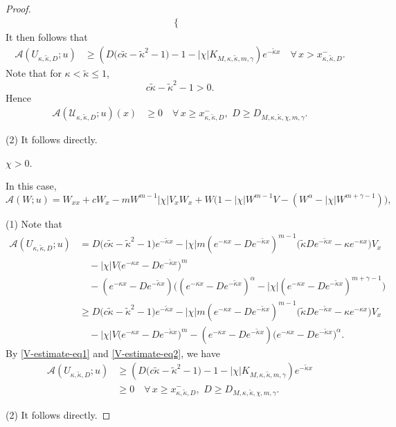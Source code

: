 \documentclass[11pt]{article} %
\theoremstyle{remark}
\theoremstyle{remark}
\numberwithin{equation}{section}
\numberwithin{figure}{section}
\numberwithin{table}{section}
\begin{document}
\begin{proof}
\begin{align*}
\begin{cases}
\end{cases}
\end{align*}
It then follows that
\begin{align*}
\mathcal{A} (U_{\kappa,\tilde\kappa, D};u)
&\ge \left( D\big( c\tilde\kappa-\tilde\kappa^2 -1\big) -1-|\chi| K_{M,\kappa,\tilde\kappa,m,\gamma} \right)  e^{-\tilde \kappa x}\quad \forall\, x>x_{\kappa,\tilde\kappa,D}^-.
\end{align*}
Note that 
for $\kappa<\tilde\kappa\le 1$, 
$$
c\tilde\kappa -\tilde \kappa^2 -1>0.
$$ 
Hence
\begin{align*}
\mathcal{A}(\mathcal{U}_{\kappa,\tilde\kappa,D};u)(x)&\ge 0\quad \forall\, x\ge x_{\kappa,\tilde\kappa,D}^-,\,\, D\ge D_{M,\kappa,\tilde\kappa,\chi,m,\gamma}.
\end{align*}


(2)  It follows directly.


\smallskip


 $\chi>0$.

\smallskip

In this case,
$$
\mathcal{A}(W;u)=W_{xx}+cW_x- m W^{m-1} |\chi| V_x W_x + W\big(1- |\chi|W^{m-1} V -(W^\alpha -|\chi| W^{m+\gamma-1})\big),
$$

\smallskip

(1) Note that 
\begin{align*}
\mathcal{A}(U_{\kappa,\tilde\kappa,D};u)   
&={ D\Big(c\tilde\kappa-{\tilde\kappa^2}-1\Big) e^{-\tilde \kappa x} } -{ |\chi| m (e^{-\kappa x}-De^{-\tilde \kappa x})^{m-1} \Big(\tilde\kappa D e^{-\tilde\kappa x}-\kappa e^{-\kappa x}\Big) V_x }\\
&\quad -{ |\chi|  V\big(e^{-\kappa x}-D e^{-\tilde \kappa  x}\big)^m}\\
&\quad -{ (e^{-\kappa x}-De^{-\tilde\kappa x})\Big ((e^{- \kappa x}-D e^{-\tilde \kappa x})^\alpha -|\chi|  (e^{-\kappa x}-D e^{-\tilde \kappa x})^{m+\gamma -1}\Big ) }\\
&\ge { D\Big(c\tilde\kappa-{\tilde\kappa^2}-1\Big) e^{-\tilde \kappa x} } -{ |\chi| m (e^{-\kappa x}-De^{-\tilde \kappa x})^{m-1} \Big(\tilde\kappa D e^{-\tilde\kappa x}-\kappa e^{-\kappa x}\Big) V_x }\\
&\quad -{ |\chi|  V\big(e^{-\kappa x}-D e^{-\tilde \kappa  x}\big)^m} -{ (e^{-\kappa x}-De^{-\tilde\kappa x})\big(e^{- \kappa x}-D e^{-\tilde \kappa x}\big)^\alpha }.
\end{align*}
By \eqref{V-estimate-eq1} and \eqref{V-estimate-eq2},
we have
\begin{align*}
\mathcal{A} (U_{\kappa,\tilde\kappa, D};u)
&\ge \left( D\big( c\tilde\kappa-\tilde\kappa^2 -1\big) -1-|\chi| K_{M,\kappa,\tilde\kappa,m,\gamma} \right)  e^{-\tilde \kappa x}\\
&\ge 0\quad \forall\, x\ge x_{\kappa,\tilde\kappa,D}^-,\,\, D\ge D_{M,\kappa,\tilde\kappa,\chi,m,\gamma}.
\end{align*}


(2) It follows directly.
\end{proof}
\end{document}

